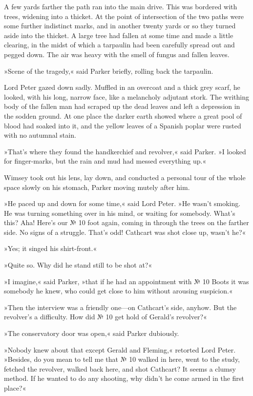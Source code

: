 A few yards farther the path ran into the main drive. This was bordered with trees, widening into a thicket. At the point of intersection of the two paths were some further indistinct marks, and in another twenty yards or so they turned aside into the thicket. A large tree had fallen at some time and made a little clearing, in the midst of which a tarpaulin had been carefully spread out and pegged down. The air was heavy with the smell of fungus and fallen leaves.

»Scene of the tragedy,« said Parker briefly, rolling back the tarpaulin.

Lord Peter gazed down sadly. Muffled in an overcoat and a thick grey scarf, he looked, with his long, narrow face, like a melancholy adjutant stork. The writhing body of the fallen man had scraped up the dead leaves and left a depression in the sodden ground. At one place the darker earth showed where a great pool of blood had soaked into it, and the yellow leaves of a Spanish poplar were rusted with no autumnal stain.

»That's where they found the handkerchief and revolver,« said Parker. »I looked for finger-marks, but the rain and mud had messed everything up.«

Wimsey took out his lens, lay down, and conducted a personal tour of the whole space slowly on his stomach, Parker moving mutely after him.

»He paced up and down for some time,« said Lord Peter. »He wasn't smoking. He was turning something over in his mind, or waiting for somebody. What's this? Aha! Here's our № 10 foot again, coming in through the trees on the farther side. No signs of a struggle. That's odd! Cathcart was shot close up, wasn't he?«

»Yes; it singed his shirt-front.«

»Quite so. Why did he stand still to be shot at?«

»I imagine,« said Parker, »that if he had an appointment with № 10 Boots it was somebody he knew, who could get close to him without arousing suspicion.«

»Then the interview was a friendly one—on Cathcart's side, anyhow. But the revolver's a difficulty. How did № 10 get hold of Gerald's revolver?«

»The conservatory door was open,« said Parker dubiously.

»Nobody knew about that except Gerald and Fleming,« retorted Lord Peter. »Besides, do you mean to tell me that № 10 walked in here, went to the study, fetched the revolver, walked back here, and shot Cathcart? It seems a clumsy method. If he wanted to do any shooting, why didn't he come armed in the first place?«

